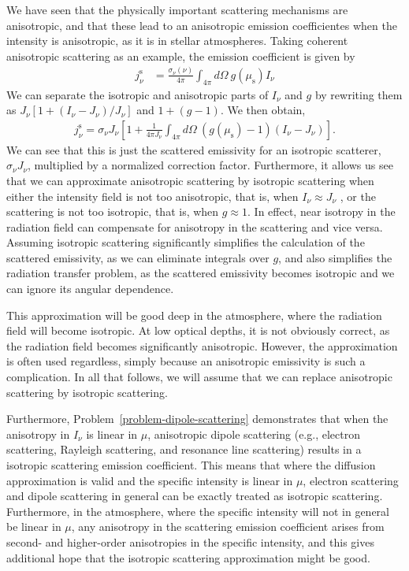 We have seen that the physically important scattering
mechanisms are anisotropic, and that these lead to an
anisotropic emission coefficientes when the intensity is
anisotropic, as it is in stellar atmospheres. Taking
coherent anisotropic scattering as an example, the emission
coefficient is given by
\begin{align}
j_\nu^\mathrm{s} &= 
\frac{\sigma_\nu(\nu)}{4\pi} 
\int_{4\pi} \!\!\! d\Omega
\:
g(\mu_\mathrm{s}) I_\nu
\end{align}
We can separate the isotropic and anisotropic parts of
$I_\nu$ and $g$ by rewriting them as $J_\nu[1 + (I_\nu-J_\nu)/J_\nu]$
and $1 + (g - 1)$. We then obtain,
\begin{align}
j_\nu^\mathrm{s} =  
\sigma_\nu J_\nu
\left[
1
+ 
\frac{1}{4\pi J_\nu}
\int_{4\pi} \!\!\! d\Omega
\:
(g(\mu_\mathrm{s}) - 1) (I_\nu - J_\nu)\right].
\end{align}
We can see that this is just the scattered emissivity for an
isotropic scatterer, $\sigma_\nu J_\nu$, multiplied by a
normalized correction factor. Furthermore, it allows us see
that we can approximate anisotropic scattering by isotropic
scattering when either the intensity field is not too
anisotropic, that is, when $I_\nu \approx J_\nu$ , or the
scattering is not too isotropic, that is, when $g
\approx 1$. In
effect, near isotropy in the radiation field can compensate
for anisotropy in the scattering and vice versa. Assuming
isotropic scattering significantly simplifies the
calculation of the scattered emissivity, as we can eliminate
integrals over $g$, and also simplifies the radiation
transfer problem, as the scattered emissivity becomes
isotropic and we can ignore its angular dependence.

This approximation will be good deep in the atmosphere,
where the radiation field will become isotropic. At low
optical depths, it is not obviously correct, as the
radiation field becomes significantly anisotropic. However,
the approximation is often used regardless, simply because
an anisotropic emissivity is such a complication. In all
that follows, we will assume that we can replace anisotropic
scattering by isotropic scattering.

Furthermore, Problem~\ref{problem-dipole-scattering}
demonstrates that when the anisotropy in $I_\nu$ is linear
in $\mu$, anisotropic dipole scattering (e.g., electron
scattering, Rayleigh scattering, and resonance line
scattering) results in a isotropic scattering emission
coefficient. This means that where the diffusion
approximation is valid and the specific intensity is linear
in $\mu$, electron scattering and dipole scattering in
general can be exactly treated as isotropic scattering.
Furthermore, in the atmosphere, where the specific intensity
will not in general be linear in $\mu$, any anisotropy in
the scattering emission coefficient arises from second- and
higher-order anisotropies in the specific intensity, and
this gives additional hope that the isotropic scattering
approximation might be good.

